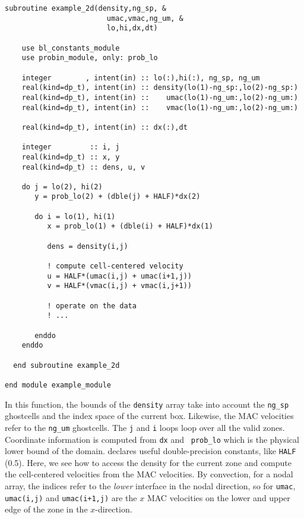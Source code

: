 \begin{lstlisting}[language={[95]fortran},mathescape=false]
  subroutine example_2d(density,ng_sp, &
                        umac,vmac,ng_um, &
                        lo,hi,dx,dt)

    use bl_constants_module
    use probin_module, only: prob_lo

    integer        , intent(in) :: lo(:),hi(:), ng_sp, ng_um
    real(kind=dp_t), intent(in) :: density(lo(1)-ng_sp:,lo(2)-ng_sp:)
    real(kind=dp_t), intent(in) ::    umac(lo(1)-ng_um:,lo(2)-ng_um:)
    real(kind=dp_t), intent(in) ::    vmac(lo(1)-ng_um:,lo(2)-ng_um:)

    real(kind=dp_t), intent(in) :: dx(:),dt

    integer         :: i, j
    real(kind=dp_t) :: x, y
    real(kind=dp_t) :: dens, u, v

    do j = lo(2), hi(2)
       y = prob_lo(2) + (dble(j) + HALF)*dx(2)

       do i = lo(1), hi(1)
          x = prob_lo(1) + (dble(i) + HALF)*dx(1)

          dens = density(i,j)

          ! compute cell-centered velocity
          u = HALF*(umac(i,j) + umac(i+1,j))
          v = HALF*(vmac(i,j) + vmac(i,j+1))

          ! operate on the data
          ! ...

       enddo
    enddo

  end subroutine example_2d

end module example_module
\end{lstlisting}

\noindent In this function, the bounds of the {\tt density} array take
into account the {\tt ng\_sp} ghostcells and the index space of the
current box.  Likewise, the MAC velocities refer to the {\tt ng\_um}
ghostcells.  The {\tt j} and {\tt i} loops loop over all the valid
zones.  Coordinate information is computed from {\tt dx} and {\tt
  prob\_lo} which is the physical lower bound of the domain.
 declares useful double-precision
constants, like {\tt HALF} (0.5).  Here, we see how to access the
density for the current zone and compute the cell-centered velocities
from the MAC velocities.  By convection, for a nodal array, the
indices refer to the {\em lower} interface in the nodal direction, so
for {\tt umac}, {\tt umac(i,j)} and {\tt umac(i+1,j)} are the $x$ MAC
velocities on the lower and upper edge of the zone in the
$x$-direction.

